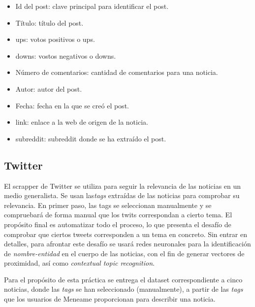 \documentclass[a4paper,12pt]{article}
\begin{document}
\begin{itemize}

\item Id del post: clave principal para identificar el post.

\item T\'itulo: t\'itulo del post.

\item ups: votos  positivos o ups.

\item downs: vostos negativos o downs.

\item N\'umero de comentarios: cantidad de comentarios para una noticia.

\item Autor: autor del post.

\item Fecha: fecha en la que se cre\'o el post.

\item link: enlace a la web de origen de la noticia.

\item subreddit: subreddit donde se ha extra\'ido el post.
\end{itemize}


\subsection{Twitter}

El scrapper de Twitter se utiliza para seguir la relevancia de las noticias en un medio generalista. Se usan las{\itshape tags} extra\'idas de las noticias para comprobar su relevancia. En primer paso, las tags se seleccionan manualmente y se compruebar\'a de forma manual que los twits correspondan a cierto tema. El prop\'osito final es automatizar todo el proceso, lo que presenta el desaf\'io de comprobar que ciertos tweets corresponden a un tema en concreto. Sin entrar en detalles, para afrontar este desaf\'io se usar\'a redes neuronales para la identificaci\'on de {\itshape nombre-entidad} en el cuerpo de las noticias, con el fin de generar vectores de proximidad, as\'i como {\itshape contextual topic recognition}.

Para el prop\'osito de esta pr\'actica se entrega el dataset correspondiente a cinco noticias, donde las {\itshape tags} se han seleccionado (manualmente), a partir de las {\itshape tags} que los usuarios de Meneame proporcionan para describir una noticia.
\end{document}
